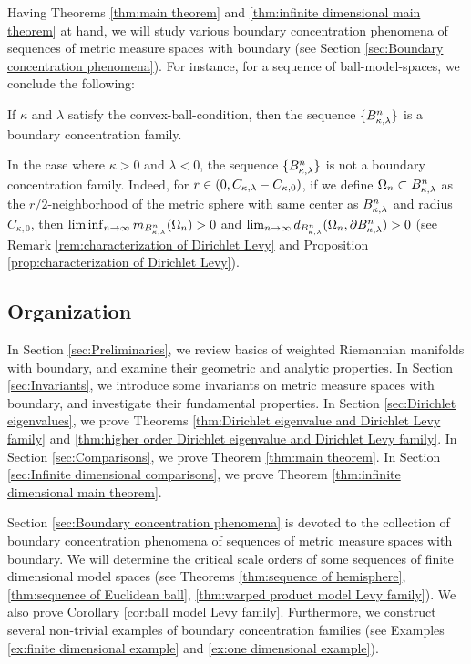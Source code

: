 Having Theorems \ref{thm:main theorem} and \ref{thm:infinite dimensional main theorem} at hand,
we will study various boundary concentration phenomena of sequences of metric measure spaces with boundary (see Section \ref{sec:Boundary concentration phenomena}).
For instance,
for a sequence of ball-model-spaces,
we conclude the following:
\begin{cor}\label{cor:ball model Levy family}
If $\kappa$ and $\lambda$ satisfy the convex-ball-condition,
then the sequence $\{B^{n}_{\kappa,\lambda}\}$ is a boundary concentration family.
\end{cor}
\begin{rem}
In the case where $\kappa>0$ and $\lambda<0$,
the sequence $\{B^{n}_{\kappa,\lambda}\}$ is not a boundary concentration family.
Indeed,
for $r\in (0,C_{\kappa,\lambda}-C_{\kappa,0})$,
if we define $\Omega_{n} \subset B^{n}_{\kappa,\lambda}$ as the $r/2$-neighborhood of the metric sphere with same center as $B^{n}_{\kappa,\lambda}$ and radius $C_{\kappa,0}$,
then $\liminf_{n\to \infty} m_{B^{n}_{\kappa,\lambda}}(\Omega_{n})>0$ and $\lim_{n\to \infty} d_{B^{n}_{\kappa,\lambda}}(\Omega_{n},\partial B^{n}_{\kappa,\lambda})>0$ (see Remark \ref{rem:characterization of Dirichlet Levy} and Proposition \ref{prop:characterization of Dirichlet Levy}).
\end{rem}

\subsection{Organization}
In Section \ref{sec:Preliminaries},
we review basics of weighted Riemannian manifolds with boundary,
and examine their geometric and analytic properties.
In Section \ref{sec:Invariants},
we introduce some invariants on metric measure spaces with boundary,
and investigate their fundamental properties.
In Section \ref{sec:Dirichlet eigenvalues},
we prove Theorems \ref{thm:Dirichlet eigenvalue and Dirichlet Levy family} and \ref{thm:higher order Dirichlet eigenvalue and Dirichlet Levy family}.
In Section \ref{sec:Comparisons},
we prove Theorem \ref{thm:main theorem}.
In Section \ref{sec:Infinite dimensional comparisons},
we prove Theorem \ref{thm:infinite dimensional main theorem}.

Section \ref{sec:Boundary concentration phenomena} is devoted to the collection of boundary concentration phenomena of sequences of metric measure spaces with boundary.
We will determine the critical scale orders of some sequences of finite dimensional model spaces (see Theorems \ref{thm:sequence of hemisphere}, \ref{thm:sequence of Euclidean ball}, \ref{thm:warped product model Levy family}).
We also prove Corollary \ref{cor:ball model Levy family}.
Furthermore,
we construct several non-trivial examples of boundary concentration families (see Examples \ref{ex:finite dimensional example} and \ref{ex:one dimensional example}).

